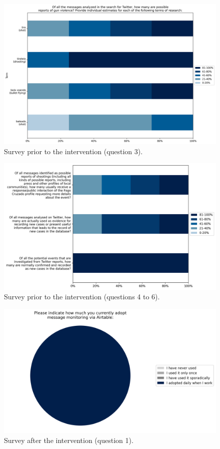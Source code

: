 \documentclass[11pt,letterpaper]{article}
\begin{document}
\begin{figure}[H]
    \centering
    \includegraphics[width=0.8\linewidth]{figs/appendix/pre-survey/pre_q3.png}
    \caption{Survey prior to the intervention (question 3).}
    \label{fig:presurvey3}
\end{figure}

\begin{figure}[H]
    \centering
    \includegraphics[width=0.8\linewidth]{figs/appendix/pre-survey/pre_q4to6.png}
    \caption{Survey prior to the intervention (questions 4 to 6).}
    \label{fig:presurvey4to6}
\end{figure}

\begin{figure}[H]
    \centering
    \includegraphics[width=0.8\linewidth]{figs/appendix/post-survey/pos_q1.png}
    \caption{Survey after the intervention (question 1).}
    \label{fig:postsurvey1}
\end{figure}
\end{document}
